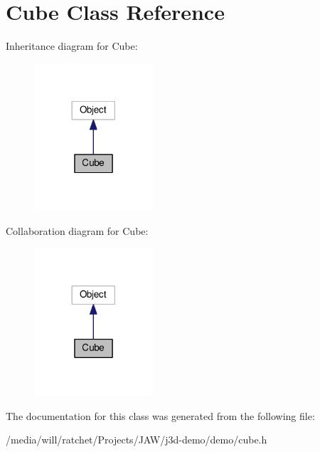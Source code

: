 \hypertarget{classCube}{}\section{Cube Class Reference}
\label{classCube}


Inheritance diagram for Cube\+:
\nopagebreak
\begin{figure}[H]
\begin{center}
\leavevmode
\includegraphics[width=125pt]{classCube__inherit__graph}
\end{center}
\end{figure}


Collaboration diagram for Cube\+:
\nopagebreak
\begin{figure}[H]
\begin{center}
\leavevmode
\includegraphics[width=125pt]{classCube__coll__graph}
\end{center}
\end{figure}


The documentation for this class was generated from the following file\+:\begin{DoxyCompactItemize}
\item 
/media/will/ratchet/\+Projects/\+J\+A\+W/j3d-\/demo/demo/cube.\+h\end{DoxyCompactItemize}
